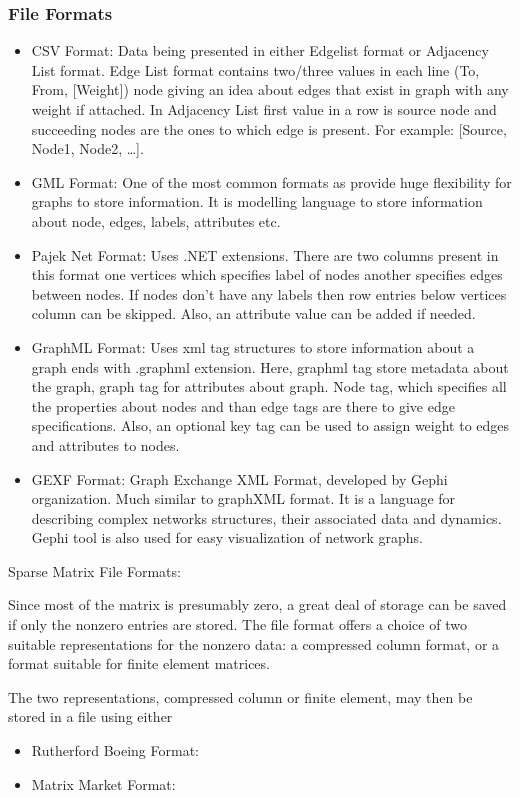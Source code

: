 \subsubsection{File Formats}
\begin{itemize}
    \item CSV Format: Data being presented in either Edgelist format or Adjacency List format. Edge List format contains two/three values in each line (To, From, [Weight]) node giving an idea about edges that exist in graph with any weight if attached. In Adjacency List first value in a row is source node and succeeding nodes are the ones to which edge is present. For example: [Source, Node1, Node2, …].
    \item GML Format: One of the most common formats as provide huge flexibility for graphs to store information. It is modelling language to store information about node, edges, labels, attributes etc.
    \item Pajek Net Format: Uses .NET extensions. There are two columns present in this format one vertices which specifies label of nodes another specifies edges between nodes. If nodes don’t have any labels then row entries below vertices column can be skipped. Also, an attribute value can be added if needed.
    \item GraphML Format: Uses xml tag structures to store information about a graph ends with .graphml extension. Here, graphml tag store metadata about the graph, graph tag for attributes about graph. Node tag, which specifies all the properties about nodes and than edge tags are there to give edge specifications. Also, an optional key tag can be used to assign weight to edges and attributes to nodes.
    \item GEXF Format: Graph Exchange XML Format, developed by Gephi organization. Much similar to graphXML format. It is a language for describing complex networks structures, their associated data and dynamics. Gephi tool is also used for easy visualization of network graphs.
\end{itemize}

\hrulefill

Sparse Matrix File Formats:

Since most of the matrix is presumably zero, a great deal of storage can be saved if only the nonzero entries are stored. The file format offers a choice of two suitable representations for the nonzero data: a compressed column format, or a format suitable for finite element matrices.

The two representations, compressed column or finite element, may then be stored in a file using either
\begin{itemize}
    \item Rutherford Boeing Format: 
    \item Matrix Market Format:
\end{itemize}


